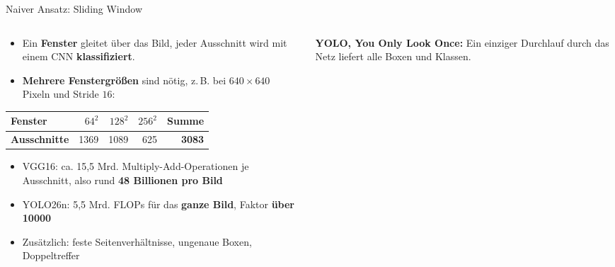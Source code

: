 \begin{frame}{Naiver Ansatz: Sliding Window}
\footnotesize
\begin{columns}
\begin{column}{0.60\textwidth}
\begin{itemize}
  \item Ein \textbf{Fenster} gleitet über das Bild, jeder Ausschnitt wird mit einem CNN \textbf{klassifiziert}.
  \item \textbf{Mehrere Fenstergrößen} sind nötig, z.\,B. bei $640 \times 640$ Pixeln und Stride $16$:
\end{itemize}
\begin{center}
\begin{tabular}{lrrrr}
\toprule
\textbf{Fenster} & $64^2$ & $128^2$ & $256^2$ & \textbf{Summe} \\
\midrule
\textbf{Ausschnitte} & \num{1369} & \num{1089} & 625 & \textbf{\num{3083}} \\
\bottomrule
\end{tabular}
\end{center}
\begin{itemize}
  \item VGG16: ca. 15,5 Mrd. Multiply-Add-Operationen je Ausschnitt, also rund \textbf{48 Billionen pro Bild}
  \item YOLO26n: 5,5 Mrd. FLOPs für das \textbf{ganze Bild}, Faktor \textbf{über \num{10000}}
  \item Zusätzlich: feste Seitenverhältnisse, ungenaue Boxen, Doppeltreffer
\end{itemize}
\end{column}
\begin{column}{0.35\textwidth}
\centering
{}

\vspace{1em}
\raggedright
\textbf{YOLO, You Only Look Once:} Ein einziger Durchlauf durch das Netz liefert alle Boxen und Klassen.
\end{column}
\end{columns}
\end{frame}

